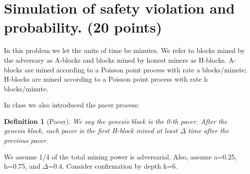 \documentclass{article}
\newtheorem{definition}{Definition}
\begin{document}
\section{Simulation of safety violation and probability. (20 points)}

In this problem we let the units of time be minutes. We refer to blocks mined by the adversary as A-blocks and blocks mined by honest miners as H-blocks. A-blocks are mined according to a Poisson point process with rate a blocks/minute; H-blocks are mined according to a Poisson point process with rate h blocks/minute.

In class we also introduced the pacer process:

\begin{definition}[Pacer]
    We say the genesis block is the 0-th pacer. After the genesis block, each pacer is the first H-block mined at least \(\Delta\) time after the previous pacer.
\end{definition}

We assume 1/4 of the total mining power is adversarial. Also, assume a=0.25, h=0.75, and \(\Delta\)=0.4. Consider confirmation by depth k=6.
\end{document}

